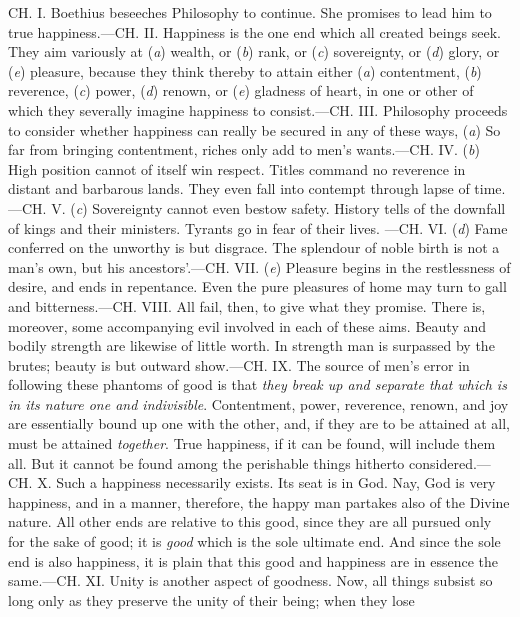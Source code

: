 CH. I. Boethius beseeches Philosophy to continue. She promises to
lead him to true happiness.—CH. II. Happiness is the one end which
all created beings seek. They aim variously at (\emph{a}) wealth, or
(\emph{b}) rank, or (\emph{c}) sovereignty, or (\emph{d}) glory, or (\emph{e})
pleasure, because they think thereby to attain either (\emph{a})
contentment, (\emph{b}) reverence, (\emph{c}) power, (\emph{d}) renown, or (\emph{e})
gladness of heart, in one or other of which they severally imagine
happiness to consist.—CH. III. Philosophy proceeds to consider
whether happiness can really be secured in any of these ways, (\emph{a})
So far from bringing contentment, riches only add to men's
wants.—CH. IV. (\emph{b}) High position cannot of itself win respect.
Titles command no reverence in distant and barbarous lands. They
even fall into contempt through lapse of time.—CH. V. (\emph{c})
Sovereignty cannot even bestow safety. History tells of the
downfall of kings and their ministers. Tyrants go in fear of their
lives. —CH. VI. (\emph{d}) Fame conferred on the unworthy is but
disgrace. The splendour of noble birth is not a man's own, but his
ancestors'.—CH. VII. (\emph{e}) Pleasure begins in the restlessness of
desire, and ends in repentance. Even the pure pleasures of home may
turn to gall and bitterness.—CH. VIII. All fail, then, to give
what they promise. There is, moreover, some accompanying evil
involved in each of these aims. Beauty and bodily strength are
likewise of little worth. In strength man is surpassed by the
brutes; beauty is but outward show.—CH. IX. The source of men's
error in following these phantoms of good is that \emph{they break up
and separate that which is in its nature one and indivisible}.
Contentment, power, reverence, renown, and joy are essentially
bound up one with the other, and, if they are to be attained at
all, must be attained \emph{together}. True happiness, if it can be
found, will include them all. But it cannot be found among the
perishable things hitherto considered.—CH. X. Such a happiness
necessarily exists. Its seat is in God. Nay, God is very happiness,
and in a manner, therefore, the happy man partakes also of the
Divine nature. All other ends are relative to this good, since they
are all pursued only for the sake of good; it is \emph{good} which is
the sole ultimate end. And since the sole end is also happiness, it
is plain that this good and happiness are in essence the same.—CH.
XI. Unity is another aspect of goodness. Now, all things subsist so
long only as they preserve the unity of their being; when they lose
